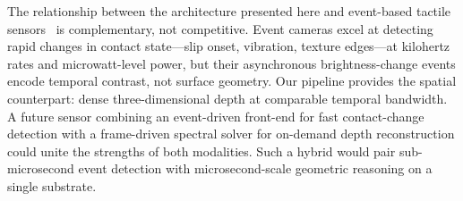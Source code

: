 \documentclass[10pt,a4paper]{article}
\begin{document}
The relationship between the architecture presented here and event-based tactile sensors~\cite{funk2024evetac,jiang2026spikingtac} is complementary, not competitive. Event cameras excel at detecting rapid changes in contact state---slip onset, vibration, texture edges---at kilohertz rates and microwatt-level power, but their asynchronous brightness-change events encode temporal contrast, not surface geometry. Our pipeline provides the spatial counterpart: dense three-dimensional depth at comparable temporal bandwidth. A future sensor combining an event-driven front-end for fast contact-change detection with a frame-driven spectral solver for on-demand depth reconstruction could unite the strengths of both modalities. Such a hybrid would pair sub-microsecond event detection with microsecond-scale geometric reasoning on a single substrate.
\end{document}
